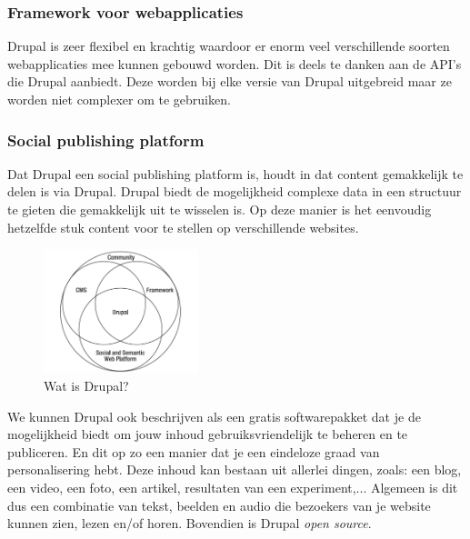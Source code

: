 \subsubsection{Framework voor webapplicaties}

Drupal is zeer flexibel en krachtig waardoor er enorm veel verschillende soorten webapplicaties mee kunnen gebouwd worden. Dit is deels te danken aan de API's die Drupal aanbiedt. Deze worden bij elke versie van Drupal uitgebreid maar ze worden niet complexer om te gebruiken. %

\subsubsection{Social publishing platform}

Dat Drupal een social publishing platform is, houdt in dat content gemakkelijk te delen is via Drupal. Drupal biedt de mogelijkheid complexe data in een structuur te gieten die gemakkelijk uit te wisselen is. Op deze manier is het eenvoudig hetzelfde stuk content voor te stellen op verschillende websites.

\begin{figure}[h]
\centering
\includegraphics[width=0.4\textwidth]{fig/watIsDrupal}
\caption{Wat is Drupal?}
\vspace{-10pt}
\label{fig:watIsDrupal}
\end{figure}

We kunnen Drupal ook beschrijven als een gratis softwarepakket dat je de mogelijkheid biedt om jouw inhoud gebruiksvriendelijk te beheren en te publiceren. En dit op zo een manier dat je een eindeloze graad van personalisering hebt. Deze inhoud kan bestaan uit allerlei dingen, zoals: een blog, een video, een foto, een artikel, resultaten van een experiment,... Algemeen is dit dus een combinatie van tekst, beelden en audio die bezoekers van je website kunnen zien, lezen en/of horen. Bovendien is Drupal \textit{open source}.

